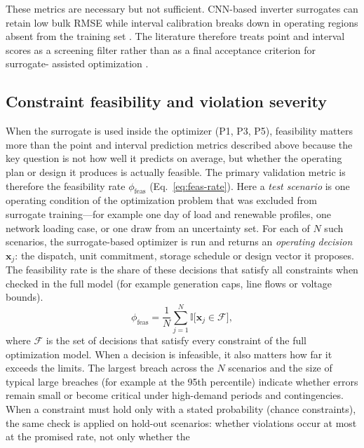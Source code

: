 These metrics are necessary but not sufficient.
CNN-based inverter surrogates can retain low bulk RMSE while interval
calibration breaks down in operating regions absent from the training
set \cite{Subedi2026157}.
The literature therefore treats point and interval scores as a screening
filter rather than as a final acceptance criterion for surrogate-
assisted optimization \cite{Khaloie2025,Lim2025,Starke2025214}.

\subsection{Constraint feasibility and violation severity}
\label{sec:val:feasibility}

When the surrogate is used inside the optimizer (P1, P3, P5),
feasibility matters more than the point and interval prediction metrics
described above because the key question is not how well it predicts on
average, but whether the operating plan or design it produces is
actually feasible. The primary validation metric is therefore the
feasibility rate $\phi_{\mathrm{feas}}$ (Eq.~\eqref{eq:feas-rate}).
Here a \emph{test scenario} is one operating condition of the
optimization problem that was excluded from surrogate training---for
example one day of load and renewable profiles, one network loading
case, or one draw from an uncertainty set. For each of $N$ such
scenarios, the surrogate-based optimizer is run and returns an
\emph{operating decision} $\mathbf{x}_j$: the dispatch, unit
commitment, storage schedule or design vector it proposes. The
feasibility rate is the share of these decisions that satisfy all
constraints when checked in the full model (for example generation
caps, line flows or voltage bounds).
\begin{equation}
  \phi_{\mathrm{feas}}
    = \frac{1}{N}\sum_{j=1}^{N}
      \mathbb{I}\!\big[\mathbf{x}_j \in \mathcal{F}\big],
  \label{eq:feas-rate}
\end{equation}
where $\mathcal{F}$ is the set of decisions that satisfy every
constraint of the full optimization model. When a decision is
infeasible, it also matters how far it exceeds the limits. The largest
breach across the $N$ scenarios and the size of typical large breaches
(for example at the 95th percentile) indicate whether errors remain
small or become critical under high-demand periods and contingencies.
When a constraint must hold only with a stated probability (chance
constraints), the same check is applied on hold-out scenarios: whether
violations occur at most at the promised rate, not only whether the
